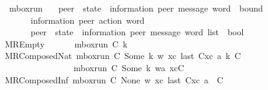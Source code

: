 \begin{isabellebody}
\ mbox{\isacharunderscore}{\kern0pt}run\isanewline
\ \ {\isacharcolon}{\kern0pt}{\isacharcolon}{\kern0pt}\ {\isachardoublequoteopen}{\isacharparenleft}{\kern0pt}{\isacharprime}{\kern0pt}peer\ {\isasymRightarrow}\ {\isacharparenleft}{\kern0pt}{\isacharprime}{\kern0pt}state\ {\isasymtimes}\ {\isacharparenleft}{\kern0pt}{\isacharprime}{\kern0pt}information{\isacharcomma}{\kern0pt}\ {\isacharprime}{\kern0pt}peer{\isacharparenright}{\kern0pt}\ message\ word{\isacharparenright}{\kern0pt}{\isacharparenright}{\kern0pt}\ {\isasymRightarrow}\ bound\ {\isasymRightarrow}\isanewline
\ \ \ \ \ \ {\isacharparenleft}{\kern0pt}{\isacharprime}{\kern0pt}information{\isacharcomma}{\kern0pt}\ {\isacharprime}{\kern0pt}peer{\isacharparenright}{\kern0pt}\ action\ word\ {\isasymRightarrow}\isanewline
\ \ \ \ \ \ {\isacharparenleft}{\kern0pt}{\isacharprime}{\kern0pt}peer\ {\isasymRightarrow}\ {\isacharparenleft}{\kern0pt}{\isacharprime}{\kern0pt}state\ {\isasymtimes}\ {\isacharparenleft}{\kern0pt}{\isacharprime}{\kern0pt}information{\isacharcomma}{\kern0pt}\ {\isacharprime}{\kern0pt}peer{\isacharparenright}{\kern0pt}\ message\ word{\isacharparenright}{\kern0pt}{\isacharparenright}{\kern0pt}\ list\ {\isasymRightarrow}\ bool{\isachardoublequoteclose}\ \isanewline
MREmpty{\isacharcolon}{\kern0pt}\ \ \ \ \ \ \ {\isachardoublequoteopen}mbox{\isacharunderscore}{\kern0pt}run\ C\ k\ {\isasymepsilon}\ {\isacharparenleft}{\kern0pt}{\isacharbrackleft}{\kern0pt}{\isacharbrackright}{\kern0pt}{\isacharparenright}{\kern0pt}{\isachardoublequoteclose}\ {\isacharbar}{\kern0pt}\isanewline
MRComposedNat{\isacharcolon}{\kern0pt}\ {\isachardoublequoteopen}{\isasymlbrakk}mbox{\isacharunderscore}{\kern0pt}run\ C{}\ {\isacharparenleft}{\kern0pt}Some\ k{\isacharparenright}{\kern0pt}\ w\ xc{\isacharsemicolon}{\kern0pt}\ last\ {\isacharparenleft}{\kern0pt}C{}{\isacharhash}{\kern0pt}xc{\isacharparenright}{\kern0pt}\ {\isasymmidarrow}{\isasymlangle}a{\isacharcomma}{\kern0pt}\ k{\isasymrangle}{\isasymrightarrow}\ C{\isasymrbrakk}\ {\isasymLongrightarrow}\isanewline
\ \ \ \ \ \ \ \ \ \ \ \ \ \ \ \ mbox{\isacharunderscore}{\kern0pt}run\ C{}\ {\isacharparenleft}{\kern0pt}Some\ k{\isacharparenright}{\kern0pt}\ {\isacharparenleft}{\kern0pt}w{\isasymcdot}{\isacharbrackleft}{\kern0pt}a{\isacharbrackright}{\kern0pt}{\isacharparenright}{\kern0pt}\ {\isacharparenleft}{\kern0pt}xc{\isacharat}{\kern0pt}{\isacharbrackleft}{\kern0pt}C{\isacharbrackright}{\kern0pt}{\isacharparenright}{\kern0pt}{\isachardoublequoteclose}\ {\isacharbar}{\kern0pt}\isanewline
MRComposedInf{\isacharcolon}{\kern0pt}\ {\isachardoublequoteopen}{\isasymlbrakk}mbox{\isacharunderscore}{\kern0pt}run\ C{}\ None\ w\ xc{\isacharsemicolon}{\kern0pt}\ last\ {\isacharparenleft}{\kern0pt}C{}{\isacharhash}{\kern0pt}xc{\isacharparenright}{\kern0pt}\ {\isasymmidarrow}{\isasymlangle}a{\isacharcomma}{\kern0pt}\ {\isasyminfinity}{\isasymrangle}{\isasymrightarrow}\ C{\isasymrbrakk}\ {\isasymLongrightarrow}\isanewline

\end{isabellebody}
